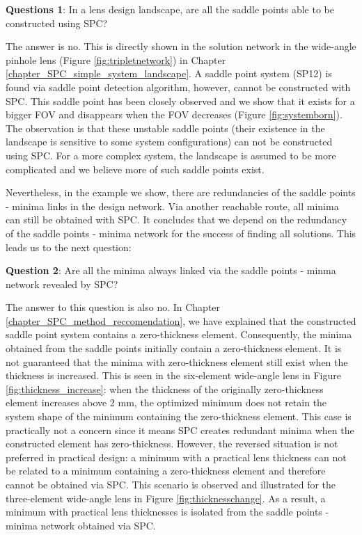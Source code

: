 \vspace{1em}

\textbf{Questions 1}:  In a lens design landscape, are all the saddle points able to be constructed using SPC? 

The answer is no. This is directly shown in the solution network in the wide-angle pinhole lens (Figure \ref{fig:tripletnetwork}) in Chapter \ref{chapter_SPC_simple_system_landscape}. A saddle point system (SP12) is found via saddle point detection algorithm, however, cannot be constructed with SPC. This saddle point has been closely observed and we show that it exists for a bigger FOV and disappears when the FOV decreases (Figure \ref{fig:systemborn}). The observation is that these unstable saddle points (their existence in the landscape is sensitive to some system configurations) can not be constructed using SPC. For a more complex system, the landscape is assumed to be more complicated and we believe more of such saddle points exist. 

Nevertheless, in the example we show, there are redundancies of the saddle points - minima links in the design network. Via another reachable route, all minima can still be obtained with SPC. It concludes that we depend on the redundancy of the saddle points - minima network for the success of finding all solutions. This leads us to the next question: 
\vspace{1em}

\textbf{Question 2}: Are all the minima always linked via the saddle points - minma network revealed by SPC?

The answer to this question is also no. In Chapter \ref{chapter_SPC_method_reccomendation}, we have explained that the constructed saddle point system contains a zero-thickness element. Consequently, the minima obtained from the saddle points initially contain a zero-thickness element. It is not guaranteed that the minima with zero-thickness element still exist when the thickness is increased. This is seen in the six-element wide-angle lens in Figure \ref{fig:thickness_increase}: when the thickness of the originally zero-thickness element increases above 2 mm, the optimized minimum does not retain the system shape of the minimum containing the zero-thickness element. This case is practically not a concern since it means SPC creates redundant minima when the constructed element has zero-thickness. However, the reversed situation is not preferred in practical design: a minimum with a practical lens thickness can not be related to a minimum containing a zero-thickness element and therefore cannot be obtained via SPC. This scenario is observed and illustrated for the three-element wide-angle lens in Figure \ref{fig:thicknesschange}. As a result, a minimum with practical lens thicknesses is isolated from the saddle points - minima network obtained via SPC. 


